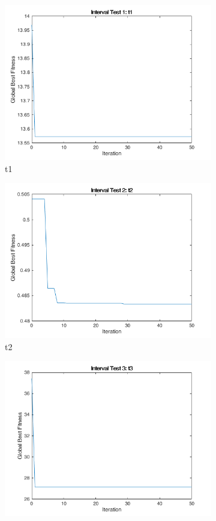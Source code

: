 \begin{figure}
\begin{subfigure}[b]{0.4\textwidth}
    \includegraphics[width=\textwidth]{img/summary/t1}
    \caption{t1}
  \end{subfigure}
  \begin{subfigure}[b]{0.4\textwidth}
    \includegraphics[width=\textwidth]{img/summary/t2}
    \caption{t2}
  \end{subfigure}
  \begin{subfigure}[b]{0.4\textwidth}
    \includegraphics[width=\textwidth]{img/summary/t3}

\end{subfigure}
\end{figure}
